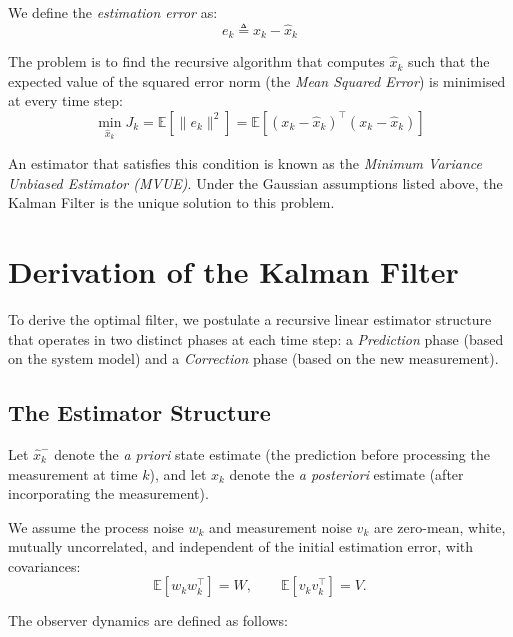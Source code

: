 We define the \emph{estimation error} as:
\begin{equation*}
	e_k \triangleq x_k - \hat{x}_k
\end{equation*}

The problem is to find the recursive algorithm that computes $\hat{x}_k$ such that the expected value of the squared error norm (the \emph{Mean Squared Error}) is minimised at every time step:
\begin{equation*}
	\min_{\hat{x}_k} J_k = \mathbb{E} \left[ \| e_k \|^2 \right] = \mathbb{E} \left[ (x_k - \hat{x}_k)^\top (x_k - \hat{x}_k) \right]
\end{equation*}

An estimator that satisfies this condition is known as the \emph{Minimum Variance Unbiased Estimator (MVUE)}. Under the Gaussian assumptions listed above, the Kalman Filter is the unique solution to this problem.


\section{Derivation of the Kalman Filter}

To derive the optimal filter, we postulate a recursive linear estimator structure that operates in two distinct phases at each time step: a \emph{Prediction} phase (based on the system model) and a \emph{Correction} phase (based on the new measurement).

\subsection{The Estimator Structure}

Let $\hat{x}_k^-$ denote the \textit{a priori} state estimate (the prediction before processing the measurement at time $k$), and let $\hat{x}_k$ denote the \textit{a posteriori} estimate (after incorporating the measurement).

We assume the process noise $w_k$ and measurement noise $v_k$ are zero-mean, white, mutually uncorrelated, and independent of the initial estimation error, with covariances:
\[
\mathbb{E}[w_k w_k^\top] = W, \qquad \mathbb{E}[v_k v_k^\top] = V.
\]

The observer dynamics are defined as follows:

